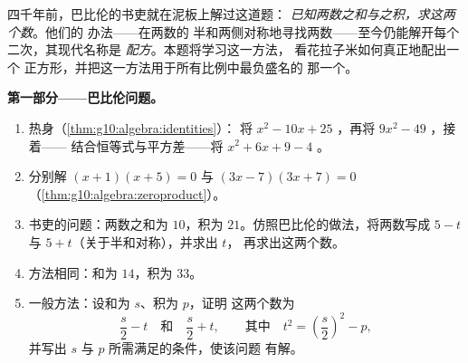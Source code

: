 \begin{problem}[{周末问题——和积问题，
以花拉子米的作图方式配方，以及
方程 $x^2 = x + 1$}]
\label{pb:g10:algebra:1}
       四千年前，巴比伦的书吏就在泥板上解过这道题：
       \emph{已知两数之和与之积，求这两个数}。他们的
       办法——在两数的
       半和两侧对称地寻找两数——至今仍能解开每个二次，其现代名称是
       \emph{配方}。本题将学习这一方法，
       看花拉子米如何真正地配出一个
       正方形，并把这一方法用于所有比例中最负盛名的
       那一个。

\medskip
\noindent\textbf{第一部分——巴比伦问题。}
\begin{enumerate}
  \item 热身（\cref{thm:g10:algebra:identities}）：
        将 $x^2 - 10x + 25$ ，再将 $9x^2 - 49$ ，接着——
        结合恒等式与平方差——将
        $x^2 + 6x + 9 - 4$ 。
  \item 分别解 $(x + 1)(x + 5) = 0$ 与
        $(3x - 7)(3x + 7) = 0$
        （\cref{thm:g10:algebra:zeroproduct}）。
  \item 书吏的问题：两数之和为 $10$，积为
        $21$。仿照巴比伦的做法，将两数写成 $5 - t$
        与 $5 + t$（关于半和对称），并求出 $t$，
        再求出这两个数。
  \item 方法相同：和为 $14$，积为 $33$。
  \item 一般方法：设和为 $s$、积为 $p$，证明
        这两个数为
        \[
        \frac s2 - t
        \quad\text{和}\quad
        \frac s2 + t,
        \qquad\text{其中}\quad
        t^2 = \left(\frac s2\right)^2 - p ,
        \]
        并写出 $s$ 与 $p$ 所需满足的条件，使该问题
        有解。
\end{enumerate}


\end{problem}
